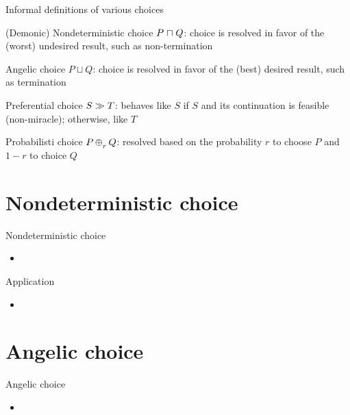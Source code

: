 \documentclass[%
slidestop,%
compress,%
mathserif,%
table,%
usenames,%
aspectratio=169,
dvipsnames,%
]{beamer}%
\begin{document}
\begin{frame}{Informal definitions of various choices}
    \begin{block}{(Demonic) Nondeterministic choice}
        $P \mathrel{\sqcap} Q$: choice is resolved in favor of the (worst) undesired result, such as non-termination
    \end{block}
    \begin{block}{Angelic choice}
        $P \sqcup Q$: choice is resolved in favor of the (best) desired result, such as termination
    \end{block}
    \begin{block}{Preferential choice}
        $S \mathrel{\gg} T$: behaves like $S$ if $S$ and its continuation is feasible (non-miracle); otherwise, like $T$
    \end{block}
    \begin{block}{Probabilisti choice}
        $P \pchoice{r} Q$: resolved based on the probability $r$ to choose $P$ and $1-r$ to choice $Q$
    \end{block}
\end{frame}

\section{Nondeterministic choice}
\begin{frame}{Nondeterministic choice}
    \begin{itemize}
        \item 
    \end{itemize}
\end{frame}

\begin{frame}{Application}
    \begin{itemize}
        \item 
    \end{itemize}
\end{frame}

\section{Angelic choice}
\begin{frame}{Angelic choice}
    \begin{itemize}
        \item 
    \end{itemize}
\end{frame}
\end{document}
